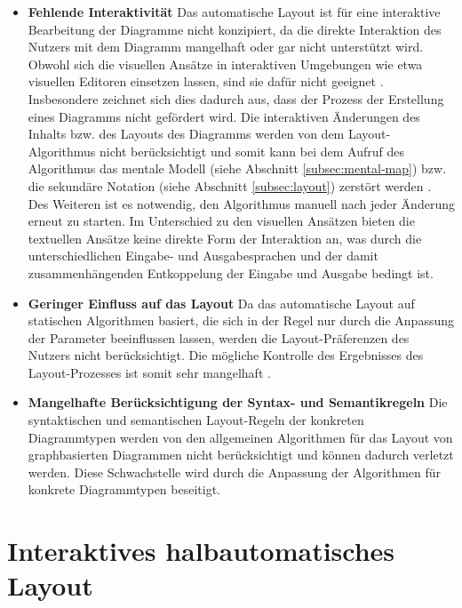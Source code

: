 \begin{itemize}
    \item \textbf{Fehlende Interaktivität} Das automatische Layout ist für eine interaktive Bearbeitung der Diagramme nicht konzipiert, da die direkte Interaktion des Nutzers mit dem Diagramm mangelhaft oder gar nicht unterstützt wird. Obwohl sich die visuellen Ansätze in interaktiven Umgebungen wie etwa visuellen Editoren einsetzen lassen, sind sie dafür nicht geeignet \cite[S.22ff]{Maier12A-Pattern-based} \cite[S.4]{DwyerMarriott08Interactive}. Insbesondere zeichnet sich dies dadurch aus, dass der Prozess der Erstellung eines Diagramms nicht gefördert wird. Die interaktiven Änderungen des Inhalts bzw. des Layouts des Diagramms werden von dem Layout-Algorithmus nicht berücksichtigt und somit kann bei dem Aufruf des Algorithmus das mentale Modell (siehe Abschnitt \ref{subsec:mental-map}) bzw. die sekundäre Notation (siehe Abschnitt \ref{subsec:layout}) zerstört werden \cite{Eiglsperger04Automatic}. Des Weiteren ist es notwendig, den Algorithmus manuell nach jeder Änderung erneut zu starten. Im Unterschied zu den visuellen Ansätzen bieten die textuellen Ansätze keine direkte Form der Interaktion an, was durch die unterschiedlichen Eingabe- und Ausgabesprachen und der damit zusammenhängenden Entkoppelung der Eingabe und Ausgabe bedingt ist.
    \item \textbf{Geringer Einfluss auf das Layout} Da das automatische Layout auf statischen Algorithmen basiert, die sich in der Regel nur durch die Anpassung der Parameter beeinflussen lassen, werden die Layout-Präferenzen des Nutzers nicht berücksichtigt. Die mögliche Kontrolle des Ergebnisses des Layout-Prozesses ist somit sehr mangelhaft \cite[S.382]{GladischSchumann14Semi-Automatic}.
    \item \textbf{Mangelhafte Berücksichtigung der Syntax- und Semantikregeln} Die syntaktischen und semantischen Layout-Regeln der konkreten Diagrammtypen werden von den allgemeinen Algorithmen für das Layout von graphbasierten Diagrammen nicht berücksichtigt und können dadurch verletzt werden. Diese Schwachstelle wird durch die Anpassung der Algorithmen für konkrete Diagrammtypen beseitigt.
\end{itemize}

\section{Interaktives halbautomatisches Layout}
\label{sec:interactive-semi-automatic-layout}

